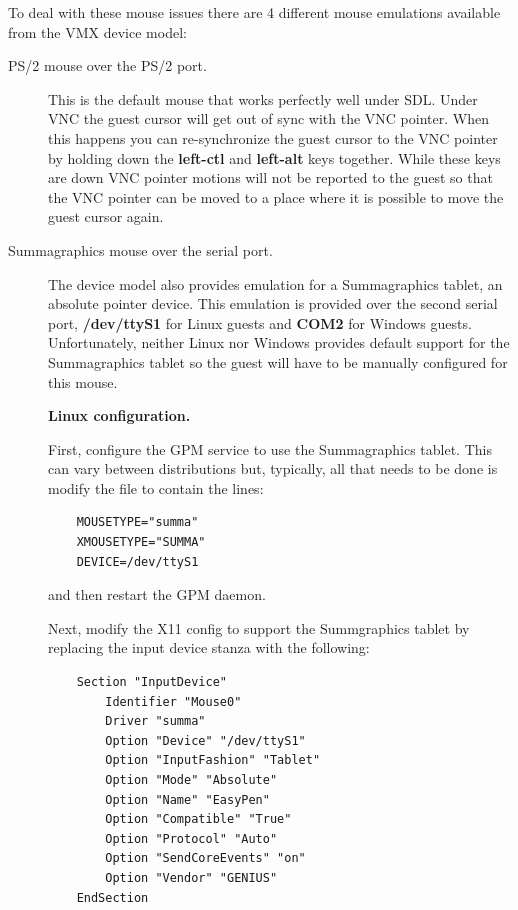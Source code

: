 \documentclass[11pt,twoside,final,openright]{report}
\begin{document}
To deal with these mouse issues there are 4 different
mouse emulations available from the VMX device model:

\begin{description}
\item[PS/2 mouse over the PS/2 port.]
This is the default mouse
that works perfectly well under SDL.
Under VNC the guest cursor will get
out of sync with the VNC pointer.
When this happens you can re-synchronize
the guest cursor to the VNC pointer by
holding down the
\textbf{left-ctl}
and
\textbf{left-alt}
keys together.
While these keys are down VNC pointer motions
will not be reported to the guest so
that the VNC pointer can be moved
to a place where it is possible
to move the guest cursor again.

\item[Summagraphics mouse over the serial port.]
The device model also provides emulation
for a Summagraphics tablet,
an absolute pointer device.
This emulation is provided over the second
serial port,
\textbf{/dev/ttyS1}
for Linux guests and
\textbf{COM2}
for Windows guests.
Unfortunately,
neither Linux nor Windows provides
default support for the Summagraphics
tablet so the guest will have to be
manually configured for this mouse.

\textbf{Linux configuration.}

First,
configure the GPM service to use the Summagraphics tablet.
This can vary between distributions but,
typically,
all that needs to be done is modify the file
 to contain the lines:

{\small
\begin{verbatim}
    MOUSETYPE="summa"
    XMOUSETYPE="SUMMA"
    DEVICE=/dev/ttyS1
\end{verbatim}
}

and then restart the GPM daemon.

Next,
modify the X11 config
to support the Summgraphics tablet by replacing
the input device stanza with the following:

{\small
\begin{verbatim}
    Section "InputDevice"
        Identifier "Mouse0"
        Driver "summa"
        Option "Device" "/dev/ttyS1"
        Option "InputFashion" "Tablet"
        Option "Mode" "Absolute"
        Option "Name" "EasyPen"
        Option "Compatible" "True"
        Option "Protocol" "Auto"
        Option "SendCoreEvents" "on"
        Option "Vendor" "GENIUS"
    EndSection
\end{verbatim}
}


\end{description}
\end{document}
